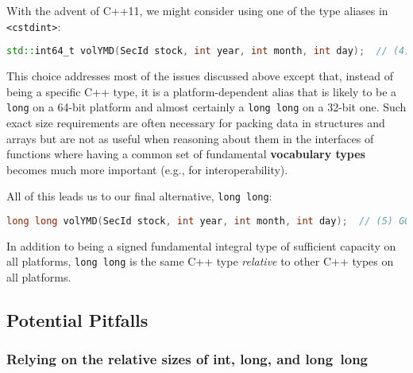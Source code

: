 With the advent of C++11, we might consider using one of the type aliases
in \texttt{<cstdint>}:

\begin{lstlisting}[language=C++]
std::int64_t volYMD(SecId stock, int year, int month, int day);  // (4) OK
\end{lstlisting}

\noindent This choice addresses most of the issues discussed above except that,
instead of being a specific C++ type, it is a platform-dependent alias
that is likely to be a \texttt{long} on a 64-bit platform and almost
certainly a \texttt{long}~\texttt{long} on a 32-bit one. Such exact size
requirements are often necessary for packing data in structures and
arrays but are not as useful when reasoning about them in the
interfaces of functions where having a common set of fundamental
\textbf{vocabulary types} becomes much more important (e.g., for
interoperability).

All of this leads us to our final alternative, \texttt{long}~\texttt{long}:

\begin{lstlisting}[language=C++]
long long volYMD(SecId stock, int year, int month, int day);  // (5) GOOD IDEA
\end{lstlisting}

\noindent In addition to being a signed fundamental integral type of sufficient
capacity on all platforms, \texttt{long}~\texttt{long} is the same C++
type \emph{relative} to other C++ types on all platforms.

\subsection[Potential Pitfalls]{Potential Pitfalls}\label{longlong-potential-pitfalls}

\subsubsection[Relying on the relative sizes of {\tt int}, {\tt long}, and {\tt long}~{\tt long}]{Relying on the relative sizes of {\SubsubsecCode int}, {\SubsubsecCode long}, and {\SubsubsecCode long}~{\SubsubsecCode long}}\label{relying-on-the-relative-sizes-of-int,-long,-and-long-long}

